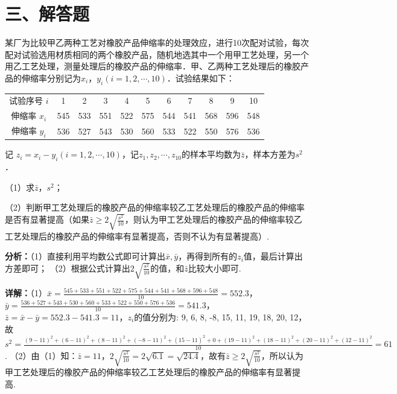\section*{三、解答题}

\begin{question}[points=12]
某厂为比较甲乙两种工艺对橡胶产品伸缩率的处理效应，进行10次配对试验，每次配对试验选用材质相同的两个橡胶产品，随机地选其中一个用甲工艺处理，另一个用乙工艺处理，测量处理后的橡胶产品的伸缩率．甲、乙两种工艺处理后的橡胶产品的伸缩率分别记为$x_i$，$y_i (i=1,2,\cdots,10)$．试验结果如下：



\begin{center}

\begin{tabular}{ccccccccccc}

试验序号 $i$ & 1 & 2 & 3 & 4 & 5 & 6 & 7 & 8 & 9 & 10 \\

伸缩率 $x_i$ & 545 & 533 & 551 & 522 & 575 & 544 & 541 & 568 & 596 & 548 \\

伸缩率 $y_i$ & 536 & 527 & 543 & 530 & 560 & 533 & 522 & 550 & 576 & 536

\end{tabular}

\end{center}

记 $z_i=x_i-y_i (i=1,2,\cdots,10)$，记$z_1,z_2,\cdots,z_{10}$的样本平均数为$\bar{z}$，样本方差为$s^2$．

（1）求$\bar{z}$，$s^2$；

（2）判断甲工艺处理后的橡胶产品的伸缩率较乙工艺处理后的橡胶产品的伸缩率是否有显著提高（如果$\bar{z}\ge 2\sqrt{\frac{s^2}{10}}$，则认为甲工艺处理后的橡胶产品的伸缩率较乙工艺处理后的橡胶产品的伸缩率有显著提高，否则不认为有显著提高）.
\begin{solution}

\textbf{分析：}（1）直接利用平均数公式即可计算出$\bar{x},\bar{y}$，再得到所有的$z_i$值，最后计算出方差即可；
（2）根据公式计算出$2\sqrt{\frac{s^2}{10}}$的值，和$\bar{z}$比较大小即可.

\textbf{详解：}（1）$\bar{x}=\frac{545+533+551+522+575+544+541+568+596+548}{10}=552.3$，$\bar{y}=\frac{536+527+543+530+560+533+522+550+576+536}{10}=541.3$，$\bar{z}=\bar{x}-\bar{y}=552.3-541.3=11$，$z_i$的值分别为: 9, 6, 8, -8, 15, 11, 19, 18, 20, 12，故$s^2=\frac{(9-11)^2+(6-11)^2+(8-11)^2+(-8-11)^2+(15-11)^2+0+(19-11)^2+(18-11)^2+(20-11)^2+(12-11)^2}{10}=61$.
（2）由（1）知：$\bar{z}=11$，$2\sqrt{\frac{s^2}{10}}=2\sqrt{6.1}=\sqrt{24.4}$，故有$\bar{z}\ge2\sqrt{\frac{s^2}{10}}$，所以认为甲工艺处理后的橡胶产品的伸缩率较乙工艺处理后的橡胶产品的伸缩率有显著提高.
\end{solution}
\end{question}

